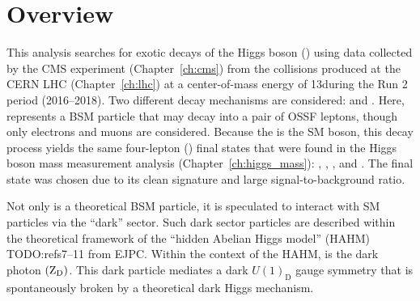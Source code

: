 \section{Overview}
This analysis searches for exotic decays of the Higgs boson (\PH) using data collected by the CMS experiment (Chapter~\ref{ch:cms}) from the \pp collisions produced at the CERN LHC (Chapter~\ref{ch:lhc}) at a center-of-mass energy of 13\TeV during the Run 2 period (2016--2018).
Two different decay mechanisms are considered: \htozx and \htoxx.
Here, \PX represents a BSM particle that may decay into a pair of OSSF leptons, though only electrons and muons are considered.
Because the \PZ is the SM \PZ boson, this decay process yields the same four-lepton (\fourl) final states that were found in the Higgs boson mass measurement analysis (Chapter~\ref{ch:higgs_mass}):
\foure, \fourmu, \twoetwomu, and \twomutwoe.
The \fourl final state was chosen due to its clean signature and large signal-to-background ratio.

Not only is \PX a theoretical BSM particle, it is speculated to interact with SM particles via the ``dark'' sector.
Such dark sector particles are described within the theoretical framework of the ``hidden Abelian Higgs model'' (HAHM) TODO:refs7--11 from EJPC.
Within the context of the HAHM, \PX is the dark photon $\left( \mathrm{Z}_\text{D} \right)$.
This dark particle mediates a dark $U(1)_\text{D}$ gauge symmetry that is spontaneously broken by a theoretical dark Higgs mechanism.

